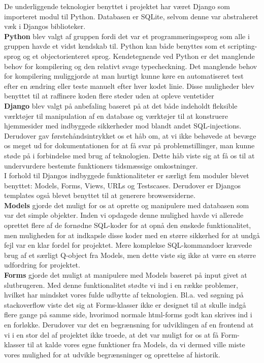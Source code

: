 \documentclass[]{article}
\begin{document}
De underliggende teknologier benyttet i projektet har været Django som importeret modul til Python. Databasen er SQLite, selvom denne var abstraheret væk i Djangos biblioteker.  \\
\indent \textbf{Python} blev valgt af gruppen fordi det var et programmeringssprog som alle i gruppen havde et vidst kendskab til. Python kan både benyttes som et scripting-sprog og et objectorienteret sprog. Kendetegnende ved Python er det manglende behov for kompilering og den relativt svage typecheckning. Det manglende behov for kompilering muliggjorde at man hurtigt kunne køre en automatiseret test efter en ændring eller teste manuelt efter hver kodet linie. Disse muligheder blev benyttet til at raffinere koden flere steder uden at opleve ventetider \cite{martin2006agile, boswell2011art} \\
\indent \textbf{Django} blev valgt på anbefaling baseret på at det både indeholdt fleksible værktøjer til manipulation af en database og værktøjer til at konstruere hjemmesider med indbyggede sikkerheder mod blandt andet SQL-injections. Derudover gav førstehåndsintrykket os et håb om, at vi ikke behøvede at bevæge os meget ud for dokumentationen for at få svar på problemstillinger, man kunne støde på i forbindelse med brug af teknologien. Dette håb viste sig at få os til at undervurdere bestemte funktioners tidsmæssige omkostninger. \\
\indent I forhold til Djangos indbyggede funktionaliteter er særligt fem moduler blevet benyttet: Models, Forms, Views, URLs og Testscases. Derudover er Djangos templates også blevet benyttet til at generere browsersiderne. \\
\indent \textbf{Models} gjorde det muligt for os at oprette og manipulere med databasen som var det simple objekter. Inden vi opdagede denne mulighed havde vi allerede oprettet flere af de fornødne SQL-koder for at opnå den ønskede funktionalitet, men muligheden for at indkapsle disse koder med en større sikkerhed for at undgå fejl var en klar fordel for projektet. Mere komplekse SQL-kommandoer krævede brug af et særligt Q-object fra Models, men dette viste sig ikke at være en større udfordring for projektet. \\
\indent \textbf{Forms} gjorde det muligt at manipulere med Models baseret på input givet at slutbrugeren. Med denne funktionalitet stødte vi ind i en række problemer, hvilket har mindsket vores fulde udbytte af teknologien. Bl.a. ved søgning på stackoverflow viste det sig at Forms-klasser ikke er designet til at skulle indgå flere gange på samme side, hvorimod normale html-forms godt kan skrives ind i en forløkke. Derudover var det en begrænsning for udviklingen af en frontend at vi i en stor del af projektet ikke troede, at det var muligt for os at få Form-klasser til at kalde vores egne funktioner fra Models, da vi dermed ville miste vores mulighed for at udvikle begrænsninger og oprettelse af historik. \\
\end{document}
